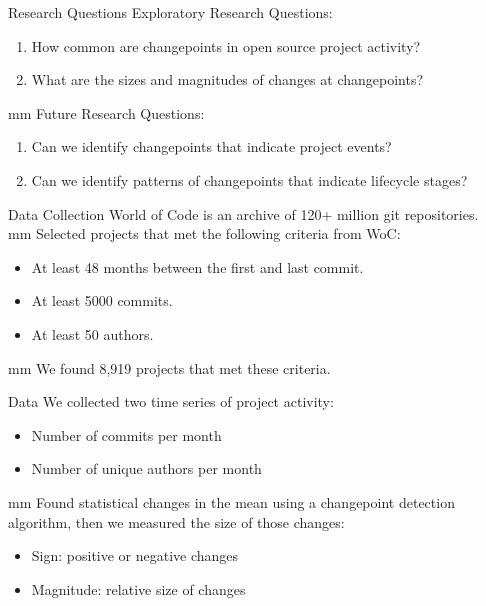 \documentclass[11pt,handout]{beamer}
\begin{document}
\begin{frame}{Research Questions}
    Exploratory Research Questions:
    \begin{enumerate}
        \item How common are changepoints in open source project activity?
        \item What are the sizes and magnitudes of changes at changepoints?
    \end{enumerate}
     mm
    Future Research Questions:
    \begin{enumerate}
        \item Can we identify changepoints that indicate project events?
        \item Can we identify patterns of changepoints that indicate lifecycle stages?
    \end{enumerate}
\end{frame}

\begin{frame}{Data Collection}
World of Code is an archive of 120+ million git repositories.\\
 mm
Selected projects that met the following criteria from WoC:
    \begin{itemize}
        \item At least 48 months between the first and last commit.
        \item At least 5000 commits.
        \item At least 50 authors.
    \end{itemize}
 mm
We found 8,919 projects that met these criteria.
\end{frame}

\begin{frame}{Data}
    We collected two time series of project activity:
    \begin{itemize}
        \item Number of commits per month
        \item Number of unique authors per month
    \end{itemize}
     mm
    Found statistical changes in the mean using a changepoint detection algorithm, then 
    we measured the size of those changes:
    \begin{itemize}
        \item Sign: positive or negative changes
        \item Magnitude: relative size of changes
    \end{itemize}
\end{frame}
\end{document}
